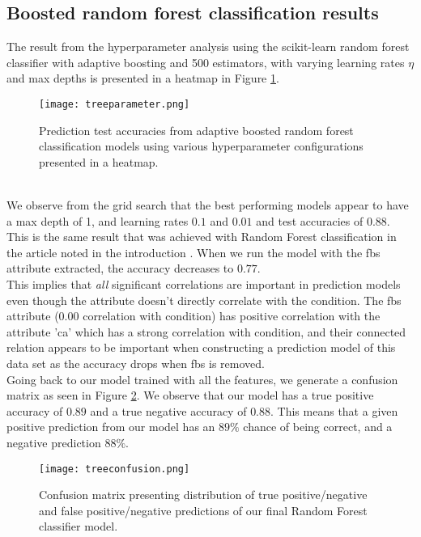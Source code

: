 \documentclass[reprint,english,notitlepage]{revtex4-1}  %
\begin{document}
\subsection{Boosted random forest classification results}

The result from the hyperparameter analysis using the scikit-learn random forest classifier with adaptive boosting and 500 estimators, with varying learning rates $\eta$ and max depths is presented in a heatmap in Figure \ref{fig:hypertree}.
\begin{figure}[h!]
    \centering
    \texttt{[image: treeparameter.png]}
    \caption{Prediction test accuracies from adaptive boosted random forest classification models using various hyperparameter configurations presented in a heatmap.}
    \label{fig:hypertree}
\end{figure}
\vspace{3mm}
\\
We observe from the grid search that the best performing models appear to have a max depth of 1, and learning rates $0.1$ and $0.01$ and test accuracies of $0.88$. This is the same result that was achieved with Random Forest classification in the article noted in the introduction \cite{Bharti_et_al}. When we run the model with the fbs attribute extracted, the accuracy decreases to $0.77$. 
\vspace{3mm}
\\
This implies that \textit{all} significant correlations are important in prediction models even though the attribute doesn't directly correlate with the condition. The fbs attribute (0.00 correlation with condition) has positive correlation with the attribute 'ca' which has a strong correlation with condition, and their connected relation appears to be important when constructing a prediction model of this data set as the accuracy drops when fbs is removed.
\vspace{3mm}
\\
Going back to our model trained with all the features, we generate a confusion matrix as seen in Figure \ref{fig:confusiontree}. We observe that our model has a true positive accuracy of $0.89$ and a true negative accuracy of $0.88$. This means that a given positive prediction from our model has an $89\%$ chance of being correct, and a negative prediction $88\%$.
\begin{figure}[h!]
    \centering
    \texttt{[image: treeconfusion.png]}
    \caption{Confusion matrix presenting distribution of true positive/negative and false positive/negative predictions of our final Random Forest classifier model.}
    \label{fig:confusiontree}
\end{figure}
\end{document}
